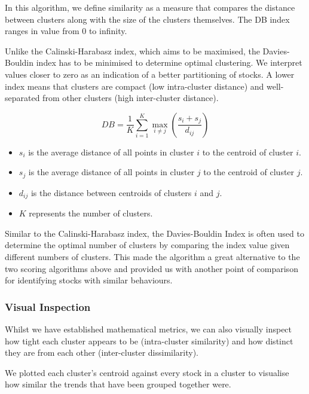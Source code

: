 \documentclass[11pt]{article}
\begin{document}
In this algorithm, we define similarity as a measure that compares the distance between clusters along with the size of the clusters themselves. The DB index ranges in value from 0 to infinity.

Unlike the Calinski-Harabasz index, which aims to be maximised, the Davies-Bouldin index has to be minimised to determine optimal clustering. We interpret values closer to zero as an indication of a better partitioning of stocks. A lower index means that clusters are compact (low intra-cluster distance) and well-separated from other clusters (high inter-cluster distance). 

\begin{equation*}
DB = \frac{1}{K} \sum_{i=1}^{K} \max_{i \neq j} \left( \frac{s_i + s_j}{d_{ij}} \right)
\end{equation*}

\begin{itemize}
    \item \( s_i \) is the average distance of all points in cluster \( i \) to the centroid of cluster \( i \).
    \item \( s_j \) is the average distance of all points in cluster \( j \) to the centroid of cluster \( j \).
    \item \( d_{ij} \) is the distance between centroids of clusters \( i \) and \( j \).
    \item \( K \) represents the number of clusters.
\end{itemize}

Similar to the Calinski-Harabasz index, the Davies-Bouldin Index is often used to determine the optimal number of clusters by comparing the index value given different numbers of clusters. This made the algorithm a great alternative to the two scoring algorithms above and provided us with another point of comparison for identifying stocks with similar behaviours. 

\subsubsection{Visual Inspection}
\label{sec:visual_inspection}

Whilst we have established mathematical metrics, we can also visually inspect how tight each cluster appears to be (intra-cluster similarity) and how distinct they are from each other (inter-cluster dissimilarity). 

We plotted each cluster's centroid against every stock in a cluster to visualise how similar the trends that have been grouped together were.
\end{document}

